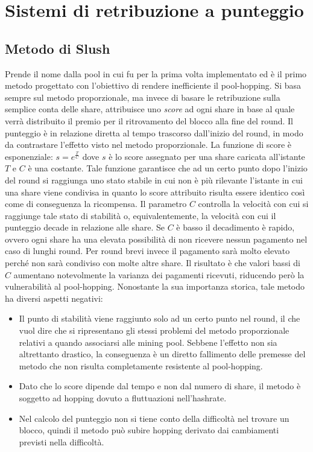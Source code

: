 \section{Sistemi di retribuzione a punteggio}

\subsection{Metodo di Slush}\label{pool-slush}

Prende il nome dalla pool in cui fu per la prima volta implementato ed è il primo metodo progettato con l'obiettivo di rendere inefficiente il pool-hopping.
Si basa sempre sul metodo proporzionale, ma invece di basare le retribuzione sulla semplice conta delle share, attribuisce uno \emph{score} ad ogni share in base al quale verrà distribuito il premio per il ritrovamento del blocco alla fine del round.
Il punteggio è in relazione diretta al tempo trascorso dall'inizio del round, in modo da contrastare l'effetto visto nel metodo proporzionale. La funzione di score è esponenziale: $s=e^{\frac{T}{C}}$ dove $s$ è lo score assegnato per una share caricata all'istante $T$ e $C$ è una costante.
Tale funzione garantisce che ad un certo punto dopo l'inizio del round si raggiunga uno stato stabile in cui non è più rilevante l'istante in cui una share viene condivisa in quanto lo score attribuito risulta essere identico così come di conseguenza la ricompensa.
Il parametro $C$ controlla la velocità con cui si raggiunge tale stato di stabilità o, equivalentemente, la velocità con cui il punteggio decade in relazione alle share. Se $C$ è basso il decadimento è rapido, ovvero ogni share ha una elevata possibilità di non ricevere nessun pagamento nel caso di lunghi round. Per round brevi invece il pagamento sarà molto elevato perché non sarà condiviso con molte altre share.
Il risultato è che valori bassi di $C$ aumentano notevolmente la varianza dei pagamenti ricevuti, riducendo però la vulnerabilità al pool-hopping.
Nonostante la sua importanza storica, tale metodo ha diversi aspetti negativi:

\begin{itemize}
	\item Il punto di stabilità viene raggiunto solo ad un certo punto nel round, il che vuol dire che si ripresentano gli stessi problemi del metodo proporzionale relativi a quando associarsi alle mining pool. Sebbene l'effetto non sia altrettanto drastico, la conseguenza è un diretto fallimento delle premesse del metodo che non risulta completamente resistente al pool-hopping.
	\item Dato che lo score dipende dal tempo e non dal numero di share, il metodo è soggetto ad hopping dovuto a fluttuazioni nell'hashrate.
	\item Nel calcolo del punteggio non si tiene conto della difficoltà nel trovare un blocco, quindi il metodo può subire hopping derivato dai cambiamenti previsti nella difficoltà.
\end{itemize}


